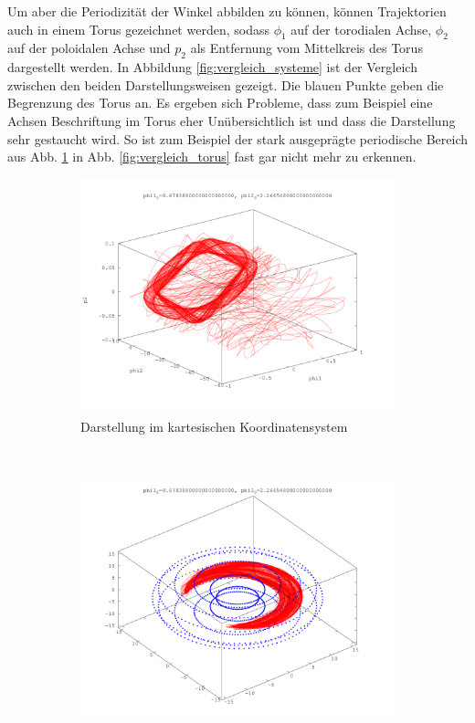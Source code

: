 Um aber die Periodizität der Winkel abbilden zu können, können Trajektorien auch in einem Torus gezeichnet werden, sodass $\phi_1$ auf der torodialen Achse, $\phi_2$ auf der poloidalen Achse und $p_2$ als Entfernung vom Mittelkreis des Torus dargestellt werden.
In Abbildung \ref{fig:vergleich_systeme} ist der Vergleich zwischen den beiden Darstellungsweisen gezeigt.
Die blauen Punkte geben die Begrenzung des Torus an.
Es ergeben sich Probleme, dass zum Beispiel eine Achsen Beschriftung im Torus eher Unübersichtlich ist und dass die Darstellung sehr gestaucht wird.
So ist zum Beispiel der stark ausgeprägte periodische Bereich aus Abb. \ref{fig:vergleich_kartesisch} in Abb. \ref{fig:vergleich_torus} fast gar nicht mehr zu erkennen.

\begin{figure}
        \centering
        \begin{subfigure}[b]{0.49\textwidth}
                \centering
                \includegraphics[width=\textwidth]{images/phasenraeume/c_diagonal_16.png}
                \caption{Darstellung im kartesischen Koordinatensystem}
                \label{fig:vergleich_kartesisch}
        \end{subfigure}
        ~
        \begin{subfigure}[b]{0.49\textwidth}
                \centering
                \includegraphics[width=\textwidth]{images/phasenraeume/c_diagonal_16_torus.png}

\end{subfigure}
\end{figure}
